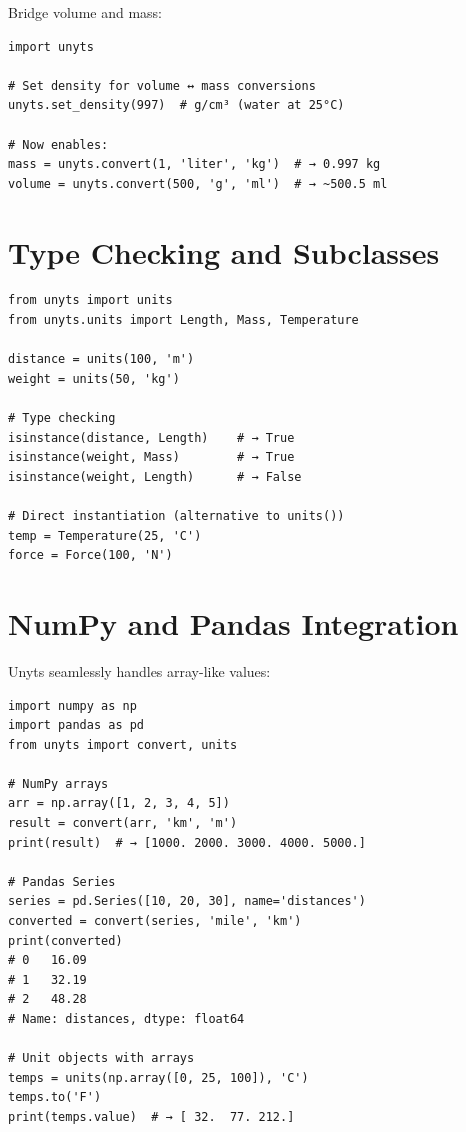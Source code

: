 \documentclass[11pt,a4paper]{report}
\begin{document}
Bridge volume and mass:

\begin{lstlisting}[style=pythonstyle]
import unyts

# Set density for volume ↔ mass conversions
unyts.set_density(997)  # g/cm³ (water at 25°C)

# Now enables:
mass = unyts.convert(1, 'liter', 'kg')  # → 0.997 kg
volume = unyts.convert(500, 'g', 'ml')  # → ~500.5 ml
\end{lstlisting}

\section{Type Checking and Subclasses}

\begin{lstlisting}[style=pythonstyle]
from unyts import units
from unyts.units import Length, Mass, Temperature

distance = units(100, 'm')
weight = units(50, 'kg')

# Type checking
isinstance(distance, Length)    # → True
isinstance(weight, Mass)        # → True
isinstance(weight, Length)      # → False

# Direct instantiation (alternative to units())
temp = Temperature(25, 'C')
force = Force(100, 'N')
\end{lstlisting}

\section{NumPy and Pandas Integration}

Unyts seamlessly handles array-like values:

\begin{lstlisting}[style=pythonstyle]
import numpy as np
import pandas as pd
from unyts import convert, units

# NumPy arrays
arr = np.array([1, 2, 3, 4, 5])
result = convert(arr, 'km', 'm')
print(result)  # → [1000. 2000. 3000. 4000. 5000.]

# Pandas Series
series = pd.Series([10, 20, 30], name='distances')
converted = convert(series, 'mile', 'km')
print(converted)
# 0   16.09
# 1   32.19
# 2   48.28
# Name: distances, dtype: float64

# Unit objects with arrays
temps = units(np.array([0, 25, 100]), 'C')
temps.to('F')
print(temps.value)  # → [ 32.  77. 212.]
\end{lstlisting}
\end{document}
